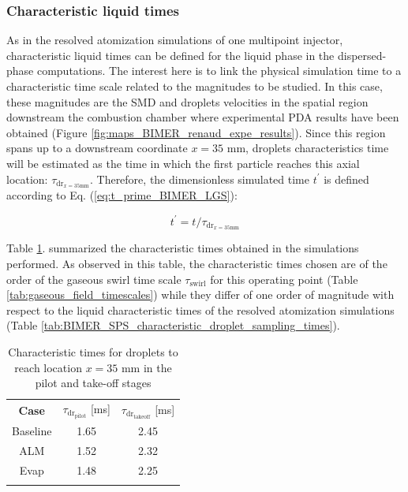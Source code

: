 \clearpage


\subsubsection*{Characteristic liquid times}

As in the resolved atomization simulations of one multipoint injector, characteristic liquid times can be defined for the liquid phase in the dispersed-phase computations. The interest here is to link the physical simulation time to a characteristic time scale related to the magnitudes to be studied. In this case, these magnitudes are the SMD and droplets velocities in the spatial region downstream the combustion chamber where experimental PDA results have been obtained (Figure \ref{fig:maps_BIMER_renaud_expe_results}). Since this region spans up to a downstream coordinate $x = 35$ mm, droplets characteristics time will be estimated as the time in which the first particle reaches this axial location: $\tau_{\mathrm{dr}_{x=35\mathrm{mm}}}$. Therefore, the dimensionless simulated time $t^{\prime}$ is defined according to Eq. (\ref{eq:t_prime_BIMER_LGS}):

\begin{equation}
\label{eq:t_prime_BIMER_LGS}
t^{\prime} = t / \tau_{\mathrm{dr}_{x=35\mathrm{mm}}}
\end{equation}


Table \ref{tab:BIMER_dispersed_phase_characteristic_times}.  summarized the characteristic times obtained in the simulations performed. As observed in this table, the characteristic times chosen are of the order of the gaseous swirl time scale $\tau_\mathrm{swirl}$ for this operating point (Table \ref{tab:gaseous_field_timescales}) while they differ of one order of magnitude with respect to the liquid characteristic times of the resolved atomization simulations (Table \ref{tab:BIMER_SPS_characteristic_droplet_sampling_times}).  %


\begin{table}[!h]
\centering
\caption{Characteristic times for droplets to reach location $x = 35$ mm in the pilot and take-off stages }
\begin{tabular}{ccc}
\thickhline
\textbf{Case} & $\tau_{\mathrm{dr}_\mathrm{pilot}}$ [ms] & $\tau_{\mathrm{dr}_\mathrm{takeoff}}$ [ms] \\
\thickhline
Baseline & 1.65 & 2.45 \\  %
ALM & 1.52 & 2.32 \\ %
Evap & 1.48 & 2.25 \\ %
\thickhline
\end{tabular}
\label{tab:BIMER_dispersed_phase_characteristic_times}
\end{table}





